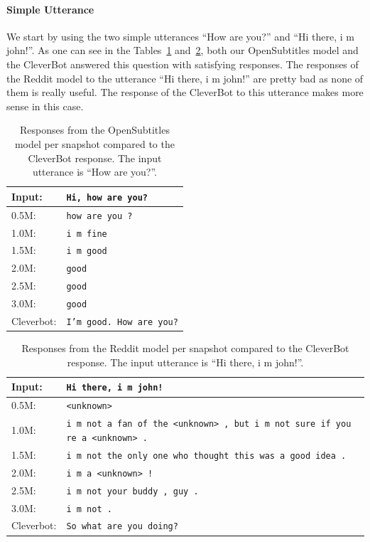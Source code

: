 \paragraph{Simple Utterance} We start by using the two simple utterances ``How are you?'' and ``Hi there, i m john!''. As one can see in the Tables~\ref{results:example1_output:OpenSubtitle_compared} and~\ref{results:example1_output:Reddit_compared}, both our OpenSubtitles model and the CleverBot answered this question with satisfying responses. The responses of the Reddit model to the utterance ``Hi there, i m john!'' are pretty bad as none of them is really useful. The response of the CleverBot to this utterance makes more sense in this case.
\\
\begin{table}[H]
	\centering
	\begin{adjustbox}{max width=\textwidth}
		\begin{tabular}{ll}
			\toprule
			Input: 	& \texttt{Hi, how are you?}\\
			\midrule
			0.5M: 	& \texttt{how are you ?}\\
			1.0M: 	& \texttt{i m fine}\\
			1.5M:	& \texttt{i m good}\\
			2.0M:	& \texttt{good}\\
			2.5M:	& \texttt{good}\\
			3.0M:	& \texttt{good}\\
			Cleverbot:	& \texttt{I'm good. How are you?}\\
			\bottomrule
		\end{tabular}
	\end{adjustbox}
\caption{Responses from the OpenSubtitles model per snapshot compared to the CleverBot response. The input utterance is ``How are you?''.}
\label{results:example1_output:OpenSubtitle_compared}

\end{table}
\begin{table}[H]
	\centering
	\begin{adjustbox}{max width=\textwidth}
		\begin{tabular}{ll}
			\toprule
			Input: 	& \texttt{Hi there, i m john!}\\
			\midrule
			0.5M:	& \texttt{<unknown>}\\
			1.0M: 	& \texttt{i m not a fan of the <unknown> , but i m not sure if you re a <unknown> .}\\
			1.5M: 	& \texttt{i m not the only one who thought this was a good idea .}\\
			2.0M:	& \texttt{i m a <unknown> !}\\
			2.5M:	& \texttt{i m not your buddy , guy .}\\
			3.0M:	& \texttt{i m not .}\\
			Cleverbot:	& \texttt{So what are you doing?}\\
			\bottomrule
		\end{tabular}
	\end{adjustbox}
	\caption{Responses from the Reddit model per snapshot compared to the CleverBot response. The input utterance is ``Hi there, i m john!''.}
	\label{results:example1_output:Reddit_compared}
\end{table}

